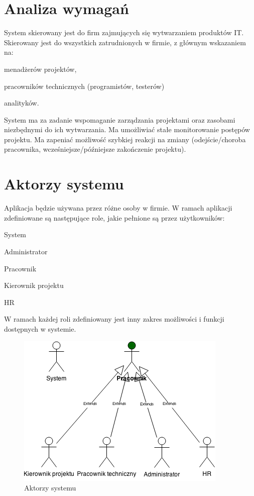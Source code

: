 \section{Analiza wymagań}
System skierowany jest do firm zajmujących się wytwarzaniem produktów IT. Skierowany jest do wszystkich zatrudnionych w firmie, z głównym wskazaniem na:
\begin{itemize*}
\item menadżerów projektów,
\item pracowników technicznych (programistów, testerów)
\item analityków.
\end{itemize*}

System ma za zadanie wspomaganie zarządzania projektami oraz zasobami niezbędnymi do ich wytwarzania. Ma umożliwiać stałe monitorowanie postępów projektu. Ma zapeniać możliwość szybkiej reakcji na zmiany (odejście/choroba pracownika, wcześniejsze/późniejsze zakończenie projektu).





\section{Aktorzy systemu}
Aplikacja będzie używana przez różne osoby w firmie. W ramach aplikacji zdefiniowane są następujące role, jakie pełnione są przez użytkowników:
\begin{itemize*}
\item System
\item Administrator
\item Pracownik
\item Kierownik projektu
\item HR
\end{itemize*}
W ramach każdej roli zdefiniowany jest inny zakres możliwości i funkcji dostępnych w systemie.

\begin{figure}[h]
    \centering
    \includegraphics{diagramy/usecases/actors.png}
    \caption{Aktorzy systemu}
    \label{fig:actors}
\end{figure}
